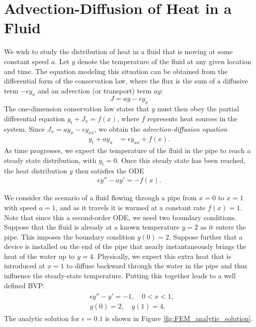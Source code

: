 \label{lab:finite_element}

\section*{Advection-Diffusion of Heat in a Fluid}

We wish to study the distribution of heat in a fluid that is moving at some constant speed $a$.
Let \(y\) denote the temperature of the fluid at any given location and time.
The equation modeling this situation can be obtained from the differential form of the conservation law, where the flux is the sum of a diffusive term \(-\epsilon y_x\) and an advection (or transport) term \(ay\):
\[
J = ay - \epsilon y_x
\]
The one-dimension conservation law states that \(y\) must then obey the partial differential equation \(
y_t + J_x = f(x)
\), where \(f\) represents heat sources in the system.
Since \(J_x = ay_x-\epsilon y_{xx}\), we obtain the \textit{advection-diffusion equation}
\begin{align*}
y_t+ay_x &=\epsilon y_{xx} +  f(x).
\end{align*}
As time progresses, we expect the temperature of the fluid in the pipe to reach a steady state distribution, with $y_t = 0$.
Once this steady state has been reached, the heat distribution \(y\) then satisfies the ODE
\begin{align*}
\epsilon y'' -ay' = -f(x).
\end{align*}

We consider the scenario of a fluid flowing through a pipe from $x = 0$ to $x = 1$ with  speed $a = 1$, and as it travels it is warmed at a constant rate $f(x)= 1$.
Note that since this a second-order ODE, we need two boundary conditions.
Suppose that the fluid is already at a known temperature \(y=2\) as it enters the pipe.
This imposes the boundary condition \(y(0)=2\).
Suppose further that a device is installed on the end of the pipe that nearly instantaneously brings the heat of the water up to $y = 4$.
Physically, we expect this extra heat that is introduced at $x = 1$ to diffuse backward through the water in the pipe and thus influence the steady-state temperature.
Putting this together leads to a well defined BVP:
\begin{align}
	\begin{split}
	&{ } \epsilon y'' - y' = -1, \quad 0 < x < 1, \\
	&{ } y(0) = 2, \quad y(1) = 4.
	\end{split}\label{eqn:FEM_steady_state}
\end{align}
The analytic solution for \(\epsilon=0.1\) is shown in Figure \ref{fig:FEM_analytic_solution}.

